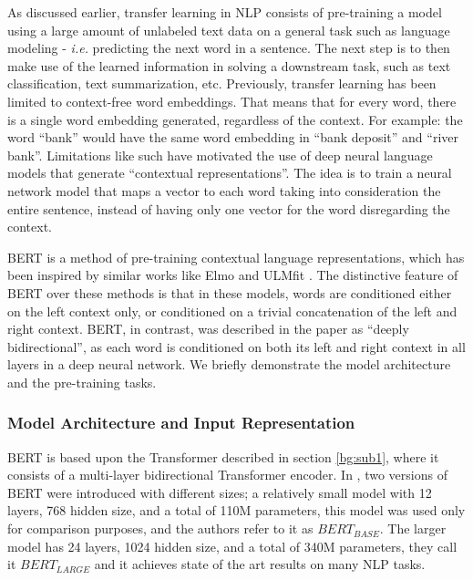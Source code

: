 As discussed earlier, transfer learning in \ac{NLP} consists of pre-training a model using a large amount of unlabeled text data on a general task such as language modeling - \textit{i.e.} predicting the next word in a sentence. The next step is to then make use of the learned information in solving a downstream task, such as text classification, text summarization, etc. Previously, transfer learning has been limited to context-free word embeddings. That means that for every word, there is a single word embedding generated, regardless of the context. For example: the word \enquote{bank} would have the same word embedding in \enquote{bank deposit} and \enquote{river bank}. Limitations like such have motivated the use of deep neural language models that generate \enquote{contextual representations}. The idea is to train a neural network model that maps a vector to each word taking into consideration the entire sentence, instead of having only one vector for the word disregarding the context.

\ac{BERT} \cite{devlin2018bert} is a method of pre-training contextual language representations, which has been inspired by similar works like Elmo \cite{Peters:2018} and ULMfit \cite{howard2018universal}. The distinctive feature of \ac{BERT} over these methods is that in these models, words are conditioned either on the left context only, or conditioned on a trivial concatenation of the left and right context. \ac{BERT}, in contrast, was described in the paper \cite{devlin2018bert} as \enquote{deeply bidirectional}, as each word is conditioned on both its left and right context in all layers in a deep neural network. We briefly demonstrate the model architecture and the pre-training tasks.

\subsubsection{Model Architecture and Input Representation}
\label{bg:s4_sub4_subsub1}

\ac{BERT} is based upon the Transformer \cite{vaswani2017attention} described in section \ref{bg:sub1}, where it consists of a multi-layer bidirectional Transformer encoder. In \cite{devlin2018bert}, two versions of \ac{BERT} were introduced with different sizes; a relatively small model with 12 layers, 768 hidden size, and a total of 110M parameters, this model was used only for comparison purposes, and the authors refer to it as $BERT_{BASE}$. The larger model has 24 layers, 1024 hidden size, and a total of 340M parameters, they call it $BERT_{LARGE}$ and it achieves state of the art results on many \ac{NLP} tasks.

